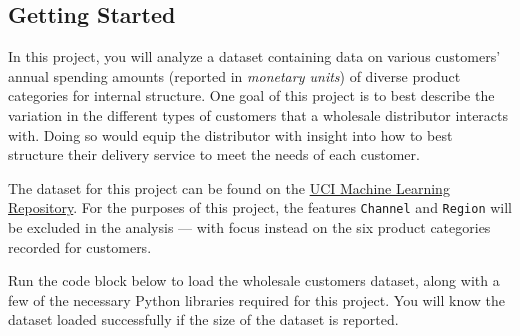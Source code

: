 \documentclass[11pt]{article}
\begin{document}
    \hypertarget{getting-started}{%
\subsection{Getting Started}\label{getting-started}}

In this project, you will analyze a dataset containing data on various
customers' annual spending amounts (reported in \emph{monetary units})
of diverse product categories for internal structure. One goal of this
project is to best describe the variation in the different types of
customers that a wholesale distributor interacts with. Doing so would
equip the distributor with insight into how to best structure their
delivery service to meet the needs of each customer.

The dataset for this project can be found on the
\href{https://archive.ics.uci.edu/ml/datasets/Wholesale+customers}{UCI
Machine Learning Repository}. For the purposes of this project, the
features \texttt{\textquotesingle{}Channel\textquotesingle{}} and
\texttt{\textquotesingle{}Region\textquotesingle{}} will be excluded in
the analysis --- with focus instead on the six product categories
recorded for customers.

Run the code block below to load the wholesale customers dataset, along
with a few of the necessary Python libraries required for this project.
You will know the dataset loaded successfully if the size of the dataset
is reported.
\end{document}
